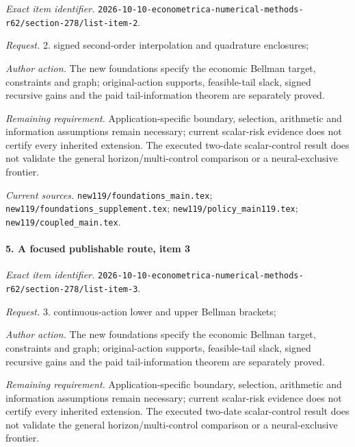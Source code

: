 \emph{Exact item identifier.} \nolinkurl{2026-10-10-econometrica-numerical-methods-r62/section-278/list-item-2}.

\par\emph{Request.} 2. signed second-order interpolation and quadrature enclosures;

\par\emph{Author action.} The new foundations specify the economic Bellman target, constraints and graph; original-action supports, feasible-tail slack, signed recursive gains and the paid tail-information theorem are separately proved.

\par\emph{Remaining requirement.} Application-specific boundary, selection, arithmetic and information assumptions remain necessary; current scalar-risk evidence does not certify every inherited extension. The executed two-date scalar-control result does not validate the general horizon/\allowbreak{}multi-control comparison or a neural-exclusive frontier.

\par\emph{Current sources.} \nolinkurl{new119/foundations_main.tex}; \nolinkurl{new119/foundations_supplement.tex}; \nolinkurl{new119/policy_main119.tex}; \nolinkurl{new119/coupled_main.tex}.

\paragraph{5. A focused publishable route, item 3}

\emph{Exact item identifier.} \nolinkurl{2026-10-10-econometrica-numerical-methods-r62/section-278/list-item-3}.

\par\emph{Request.} 3. continuous-action lower and upper Bellman brackets;

\par\emph{Author action.} The new foundations specify the economic Bellman target, constraints and graph; original-action supports, feasible-tail slack, signed recursive gains and the paid tail-information theorem are separately proved.

\par\emph{Remaining requirement.} Application-specific boundary, selection, arithmetic and information assumptions remain necessary; current scalar-risk evidence does not certify every inherited extension. The executed two-date scalar-control result does not validate the general horizon/\allowbreak{}multi-control comparison or a neural-exclusive frontier.

